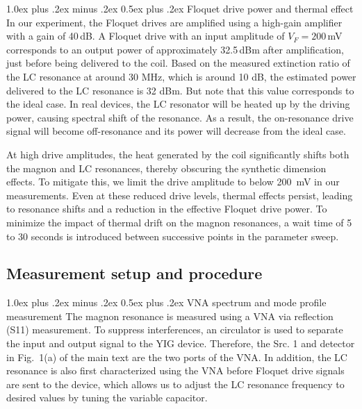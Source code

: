 \documentclass[
twocolumn,

superscriptaddress,









 amsmath,amssymb,
 aps,


prl,




]{revtex4-2}
\makeatletter
\providecommand{\subsubsection}{}
\renewcommand{\subsubsection}{
  \@startsection{subsubsection}{3}{0pt}
    {1.0ex plus .2ex minus .2ex}
    {0.5ex plus .2ex}
    {\normalfont\normalsize\bfseries\filcenter}
}
\makeatother
\begin{document}
\subsubsection{Floquet drive power and thermal effect}
In our experiment, the Floquet drives are amplified using a high-gain amplifier with a gain of 40\,dB. A Floquet drive with an input amplitude of $V_F = 200$\,mV corresponds to an output power of approximately 32.5\,dBm after amplification, just before being delivered to the coil. Based on the measured extinction ratio of the LC resonance at around 30 MHz, which is around 10 dB, the estimated power delivered to the LC resonance is 32 dBm. But note that this value corresponds to the ideal case. In real devices, the LC resonator will be heated up by the driving power, causing spectral shift of the resonance. As a result, the on-resonance drive signal will become off-resonance and its power will decrease from the ideal case.

At high drive amplitudes, the heat generated by the coil significantly shifts both the magnon and LC resonances, thereby obscuring the synthetic dimension effects. To mitigate this, we limit the drive amplitude to below 200~mV in our measurements. Even at these reduced drive levels, thermal effects persist, leading to resonance shifts and a reduction in the effective Floquet drive power. To minimize the impact of thermal drift on the magnon resonances, a wait time of 5 to 30 seconds is introduced between successive points in the parameter sweep.


\subsection{Measurement setup and procedure}
\subsubsection{VNA spectrum and mode profile measurement}
The magnon resonance is measured using a VNA via reflection (S11) measurement. To suppress interferences, an circulator is used to separate the input and output signal to the YIG device. Therefore, the Src. 1 and detector in Fig.\, 1(a) of the main text are the two ports of the VNA. In addition, the LC resonance is also first characterized using the VNA before Floquet drive signals are sent to the device, which allows us to adjust the LC resonance frequency to desired values by tuning the variable capacitor.
\end{document}

